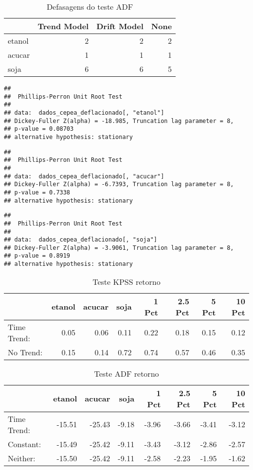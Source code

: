 \documentclass[]{article}
\begin{document}
\begin{longtable}[t]{lrrr}
\caption{\label{tab:ADF e KPSS nivel}Defasagens do teste ADF}\\
\toprule
  & Trend Model & Drift Model & None\\
\midrule
etanol & 2 & 2 & 2\\
acucar & 1 & 1 & 1\\
soja & 6 & 6 & 5\\
\bottomrule
\end{longtable}

\begin{verbatim}
## 
##  Phillips-Perron Unit Root Test
## 
## data:  dados_cepea_deflacionado[, "etanol"]
## Dickey-Fuller Z(alpha) = -18.985, Truncation lag parameter = 8,
## p-value = 0.08703
## alternative hypothesis: stationary
\end{verbatim}

\begin{verbatim}
## 
##  Phillips-Perron Unit Root Test
## 
## data:  dados_cepea_deflacionado[, "acucar"]
## Dickey-Fuller Z(alpha) = -6.7393, Truncation lag parameter = 8,
## p-value = 0.7338
## alternative hypothesis: stationary
\end{verbatim}

\begin{verbatim}
## 
##  Phillips-Perron Unit Root Test
## 
## data:  dados_cepea_deflacionado[, "soja"]
## Dickey-Fuller Z(alpha) = -3.9061, Truncation lag parameter = 8,
## p-value = 0.8919
## alternative hypothesis: stationary
\end{verbatim}

\begin{longtable}[t]{lrrrrrrr}
\caption{\label{tab:ADF e KPSS logdif}Teste KPSS retorno}\\
\toprule
  & etanol & acucar & soja & 1 Pct & 2.5 Pct & 5 Pct & 10 Pct\\
\midrule
Time Trend: & 0.05 & 0.06 & 0.11 & 0.22 & 0.18 & 0.15 & 0.12\\
No Trend: & 0.15 & 0.14 & 0.72 & 0.74 & 0.57 & 0.46 & 0.35\\
\bottomrule
\end{longtable}

\begin{longtable}[t]{lrrrrrrr}
\caption{\label{tab:ADF e KPSS logdif}Teste ADF retorno}\\
\toprule
  & etanol & acucar & soja & 1 Pct & 2.5 Pct & 5 Pct & 10 Pct\\
\midrule
Time Trend: & -15.51 & -25.43 & -9.18 & -3.96 & -3.66 & -3.41 & -3.12\\
Constant: & -15.49 & -25.42 & -9.11 & -3.43 & -3.12 & -2.86 & -2.57\\
Neither: & -15.50 & -25.42 & -9.11 & -2.58 & -2.23 & -1.95 & -1.62\\
\bottomrule
\end{longtable}
\end{document}
